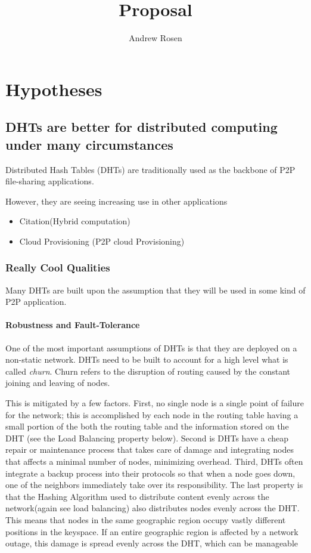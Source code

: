 \documentclass[10pt,letterpaper]{report}
\title{Proposal}
\author{Andrew Rosen}
\begin{document}
\maketitle
\setcounter{tocdepth}{4}
\tableofcontents
\newpage
\chapter{Hypotheses}

\section{DHTs are better for distributed computing under many circumstances}
Distributed Hash Tables (DHTs) are traditionally used as the backbone of P2P file-sharing applications.

However, they are seeing increasing use in other applications
\begin{itemize}
    \item Citation(Hybrid computation)
    \item Cloud Provisioning  (P2P cloud Provisioning)
\end{itemize}


\subsection{Really Cool Qualities}
Many DHTs are built upon the assumption that they will be used in some kind of P2P application.
\subsubsection{Robustness and Fault-Tolerance}
One of the most important assumptions of DHTs is that they are deployed on a non-static network.
DHTs need to be built to account for a high level what is called \textit{churn}.  
Churn refers to the disruption of routing caused by the constant joining and leaving of nodes.

This is mitigated by a few factors.  
First, no single node is a single point of failure for the network;  this is accomplished by each node in the routing table having a small portion of the both the routing table and the information stored on the DHT (see the Load Balancing property below).  
Second is DHTs have a cheap repair or maintenance process that takes care of damage and integrating nodes that affects a minimal number of nodes, minimizing overhead. 
Third, DHTs often integrate a backup process into their protocols so that when a node goes down, one of the neighbors immediately take over its responsibility.
The last property is that the Hashing Algorithm used to distribute content evenly across the network(again see load balancing) also distributes nodes evenly across the DHT.  
This means that nodes in the same geographic region occupy vastly different positions in the keyspace.  
If an entire geographic region is affected by a network outage, this damage is spread evenly across the DHT, which can be manageable
\end{document}
